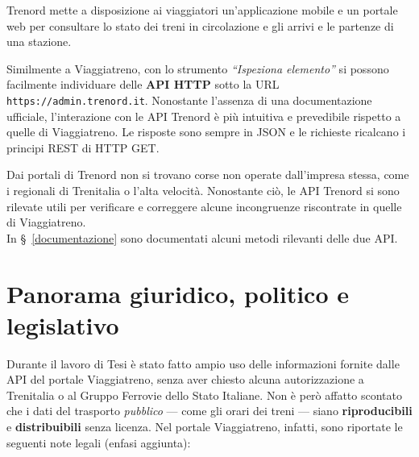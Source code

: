 \documentclass[12pt,a4paper,italian]{report}
\begin{document}
Trenord mette a disposizione ai viaggiatori un'applicazione mobile e
un portale web per consultare lo stato dei treni in circolazione e gli
arrivi e le partenze di una stazione.

Similmente a Viaggiatreno, con lo strumento \textit{``Ispeziona
    elemento''} si possono facilmente individuare delle \textbf{API
    HTTP} sotto la URL \texttt{https://admin.trenord.it}.  Nonostante
l'assenza di una documentazione ufficiale, l'interazione con le API
Trenord è più intuitiva e prevedibile rispetto a quelle di
Viaggiatreno.  Le risposte sono sempre in JSON e le richieste
ricalcano i principi REST di HTTP GET.

Dai portali di Trenord non si trovano corse non operate dall'impresa
stessa, come i regionali di Trenitalia o l'alta velocità.  Nonostante
ciò, le API Trenord si sono rilevate utili per verificare e correggere
alcune incongruenze riscontrate in quelle di Viaggiatreno. \\

In \S~\ref{documentazione} sono documentati alcuni metodi rilevanti
delle due API.

\section{Panorama giuridico, politico e legislativo}
\label{panorama_giuridico}

Durante il lavoro di Tesi è stato fatto ampio uso delle informazioni
fornite dalle API del portale Viaggiatreno, senza aver chiesto alcuna
autorizzazione a Trenitalia o al Gruppo Ferrovie dello Stato Italiane.
Non è però affatto scontato che i dati del trasporto \textit{pubblico}
--- come gli orari dei treni --- siano \textbf{riproducibili} e
\textbf{distribuibili} senza licenza.  Nel portale Viaggiatreno,
infatti, sono riportate le seguenti note legali (enfasi aggiunta):
\end{document}
